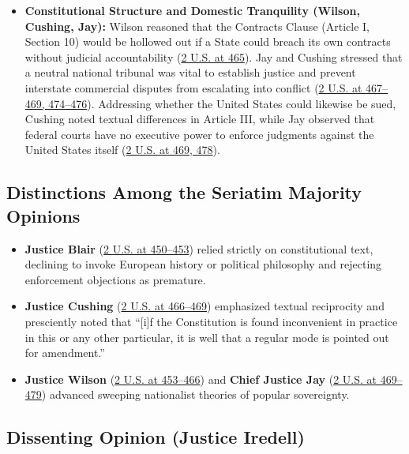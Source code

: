 \documentclass[12pt]{article}
\begin{document}
\begin{itemize}
  \item \textbf{Constitutional Structure and Domestic Tranquility (Wilson, Cushing, Jay):} Wilson reasoned that the Contracts Clause (Article I, Section 10) would be hollowed out if a State could breach its own contracts without judicial accountability (\href{https://supreme.justia.com/cases/federal/us/2/419/}{2 U.S. at 465}). Jay and Cushing stressed that a neutral national tribunal was vital to establish justice and prevent interstate commercial disputes from escalating into conflict (\href{https://supreme.justia.com/cases/federal/us/2/419/}{2 U.S. at 467--469, 474--476}). Addressing whether the United States could likewise be sued, Cushing noted textual differences in Article III, while Jay observed that federal courts have no executive power to enforce judgments against the United States itself (\href{https://supreme.justia.com/cases/federal/us/2/419/}{2 U.S. at 469, 478}).
\end{itemize}

\subsection{Distinctions Among the Seriatim Majority Opinions}

\begin{itemize}
  \item \textbf{Justice Blair} (\href{https://supreme.justia.com/cases/federal/us/2/419/}{2 U.S. at 450--453}) relied strictly on constitutional text, declining to invoke European history or political philosophy and rejecting enforcement objections as premature.
  \item \textbf{Justice Cushing} (\href{https://supreme.justia.com/cases/federal/us/2/419/}{2 U.S. at 466--469}) emphasized textual reciprocity and presciently noted that ``[i]f the Constitution is found inconvenient in practice in this or any other particular, it is well that a regular mode is pointed out for amendment.''
  \item \textbf{Justice Wilson} (\href{https://supreme.justia.com/cases/federal/us/2/419/}{2 U.S. at 453--466}) and \textbf{Chief Justice Jay} (\href{https://supreme.justia.com/cases/federal/us/2/419/}{2 U.S. at 469--479}) advanced sweeping nationalist theories of popular sovereignty.
\end{itemize}

\subsection{Dissenting Opinion (Justice Iredell)}
\end{document}
